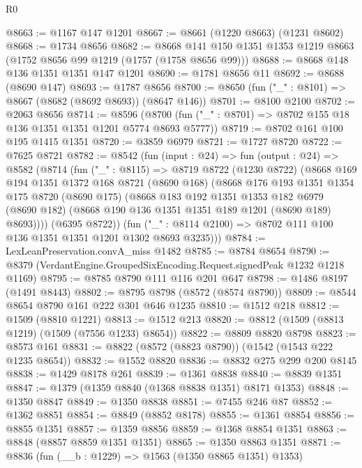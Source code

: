 \begin{lexlean}{R0}
\begin{coremodule}
@8663 := @1167 @147 @1201
@8667 := @8661 (@1220 @8663) (@1231 @8602)
@8668 := @1734 @8656
@8682 := @8668 @141 @150 @1351 @1353 @1219 @8663 (@1752 @8656 @99 @1219 (@1757 (@1758 @8656 @99)))
@8688 := @8668 @148 @136 @1351 @1351 @147 @1201
@8690 := @1781 @8656 @11
@8692 := @8688 (@8690 @147)
@8693 := @1787 @8656
@8700 := @8650 (fun ("_" : @8101) => @8667 (@8682 (@8692 @8693)) (@8647 @146))
@8701 := @8100 @2100
@8702 := @2063 @8656
@8714 := @8596
    (@8700 (fun ("_" : @8701) => @8702 @155 @18 @136 @1351 @1351 @1201 @5774 @8693 @5777))
@8719 := @8702 @161 @100 @195 @1415 @1351
@8720 := @3859 @6979
@8721 := @1727 @8720
@8722 := @7625 @8721
@8782 := @8542
    (fun (input : @24) =>
    fun (output : @24) =>
    @8582
      (@8714
        (fun ("_" : @8115) =>
        @8719
          @8722
          (@1230 @8722)
          (@8668
            @169
            @194
            @1351
            @1372
            @168
            @8721
            (@8690 @168)
            (@8668
              @176
              @193
              @1351
              @1354
              @175
              @8720
              (@8690 @175)
              (@8668
                @183
                @192
                @1351
                @1353
                @182
                @6979
                (@8690 @182)
                (@8668 @190 @136 @1351 @1351 @189 @1201 (@8690 @189) @8693))))
          (@6395 @8722))
        (fun ("_" : @8114 @2100) => @8702 @111 @100 @136 @1351 @1351 @1201 @1302 @8693 @3235)))
@8784 := LexLeanPreservation.convA_miss @1482
@8785 := @8784 @8654
@8790 := @8379 (VerdantEngine.GroupedSixEncoding.Request.signedPeak @1232 @1218 @1169)
@8795 := @8785 @8790 @111 @116 @201 @647
@8798 := @1486 @8197 (@1491 @8443)
@8802 := @8795 @8798 (@8572 (@8574 @8790))
@8809 := @8544 @8654 @8790 @161 @222 @301 @646 @1235
@8810 := @1512 @218
@8812 := @1509 (@8810 @1221)
@8813 := @1512 @213
@8820 := @8812 (@1509 (@8813 @1219) (@1509 (@7556 @1233) @8654))
@8822 := @8809 @8820 @8798
@8823 := @8573 @161
@8831 := @8822 (@8572 (@8823 @8790)) (@1542 (@1543 @222 @1235 @8654))
@8832 := @1552 @8820
@8836 := @8832 @275 @299 @200 @8145
@8838 := @1429 @8178 @261
@8839 := @1361 @8838
@8840 := @8839 @1351
@8847 := @1379 (@1359 @8840 (@1368 @8838 @1351) @8171 @1353)
@8848 := @1350 @8847
@8849 := @1350 @8838
@8851 := @7455 @246 @87
@8852 := @1362 @8851
@8854 := @8849 (@8852 @8178)
@8855 := @1361 @8854
@8856 := @8855 @1351
@8857 := @1359 @8856
@8859 := @1368 @8854 @1351
@8863 := @8848 (@8857 @8859 @1351 @1351)
@8865 := @1350 @8863 @1351
@8871 := @8836 (fun (__b : @1229) => @1563 (@1350 @8865 @1351) @1353)

\end{coremodule}
\end{lexlean}
